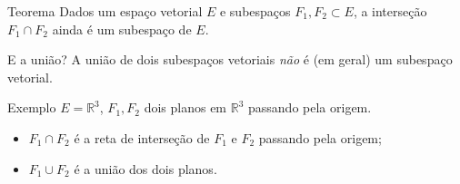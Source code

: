 \documentclass{beamer}
\begin{document}
\begin{darkframes}
\begin{frame}
  \begin{block}{Teorema}
    Dados um espaço vetorial $E$ e subespaços $F_1,F_2 \subset E$, a interseção $F_1 \cap F_2$ ainda é um subespaço de $E$.
  \end{block}
\end{frame}


\begin{frame}{E a união?}
  A união de dois subespaços vetoriais \emph{não} é (em geral) um subespaço vetorial. 

  \vfill
\end{frame}

\begin{frame}{Exemplo}
  $E = {\mathbb{R}}^3$, $F_1,F_2$ dois planos em ${\mathbb{R}}^3$ passando pela origem.
  \begin{itemize}
  \item $F_1\cap F_2$ é a reta de interseção de $F_1$ e $F_2$ passando pela origem;
  \item $F_1\cup F_2$ é a união dos dois planos.
  \end{itemize}
  

\end{frame}
\end{darkframes}
\end{document}
